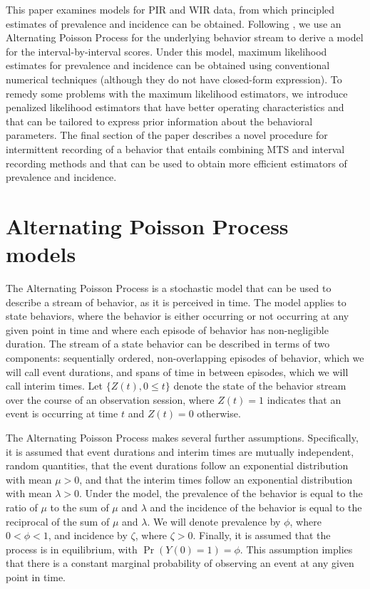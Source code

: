 \documentclass[man, noextraspace, floatsintext]{apa6}\usepackage[]{graphicx}\usepackage[]{color}
\begin{document}
This paper examines models for PIR and WIR data, from which principled estimates of prevalence and incidence can be obtained. 
Following \citet{Brown1977estimation}, we use an Alternating Poisson Process for the underlying behavior stream to derive a model for the interval-by-interval scores. 
Under this model, maximum likelihood estimates for prevalence and incidence can be obtained using conventional numerical techniques (although they do not have closed-form expression). 
To remedy some problems with the maximum likelihood estimators, we introduce penalized likelihood estimators that have better operating characteristics and that can be tailored to express prior information about the behavioral parameters.
The final section of the paper describes a novel procedure for intermittent recording of a behavior that entails combining MTS and interval recording methods and that can be used to obtain more efficient estimators of prevalence and incidence.

\section{Alternating Poisson Process models}
\label{sec:APP}

The Alternating Poisson Process is a stochastic model that can be used to describe a stream of behavior, as it is perceived in time. 
The model applies to state behaviors, where the behavior is either occurring or not occurring at any given point in time and where each episode of behavior has non-negligible duration. 
The stream of a state behavior can be described in terms of two components: sequentially ordered, non-overlapping episodes of behavior, which we will call event durations, and spans of time in between episodes, which we will call interim times. 
Let $\{Z(t), 0 \leq t\}$ denote the state of the behavior stream over the course of an observation session, where $Z(t) = 1$ indicates that an event is occurring at time $t$ and $Z(t) = 0$ otherwise.

The Alternating Poisson Process makes several further assumptions. 
Specifically, it is assumed that event durations and interim times are mutually independent, random quantities, that the event durations follow an exponential distribution with mean $\mu > 0$, and that the interim times follow an exponential distribution with mean $\lambda > 0$. 
Under the model, the prevalence of the behavior is equal to the ratio of $\mu$ to the sum of $\mu$ and $\lambda$ and the incidence of the behavior is equal to the reciprocal of the sum of $\mu$ and $\lambda$. 
We will denote prevalence by $\phi$, where $0 < \phi < 1$, and incidence by $\zeta$, where $\zeta > 0$. Finally, it is assumed that the process is in equilibrium, with $\Pr\left(Y(0) = 1\right) = \phi$. 
This assumption implies that there is a constant marginal probability of observing an event at any given point in time.
\end{document}
